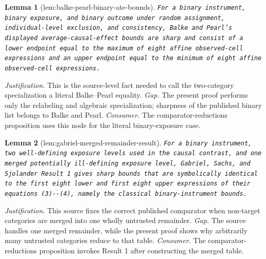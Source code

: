 \documentclass{article}
\newtheorem{lemma}{Lemma}
\begin{document}
\begin{lemma}[lem:balke-pearl-binary-ate-bounds]\label{lem:balke-pearl-binary-ate-bounds}
\texttt{For a binary instrument,\allowbreak{} binary exposure,\allowbreak{} and binary outcome under random assignment,\allowbreak{} individual-\allowbreak{}level exclusion,\allowbreak{} and consistency,\allowbreak{} Balke and Pearl's displayed average-\allowbreak{}causal-\allowbreak{}effect bounds are sharp and consist of a lower endpoint equal to the maximum of eight affine observed-\allowbreak{}cell expressions and an upper endpoint equal to the minimum of eight affine observed-\allowbreak{}cell expressions.}
\end{lemma}
\par\smallskip\noindent \textit{Justification.} This is the source-level fact needed to call the two-category specialization a literal Balke--Pearl equality. \textit{Gap.} The present proof performs only the relabeling and algebraic specialization; sharpness of the published binary list belongs to Balke and Pearl. \textit{Consumer.} The comparator-reductions proposition uses this node for the literal binary-exposure case.

\begin{lemma}[lem:gabriel-merged-remainder-result]\label{lem:gabriel-merged-remainder-result}
\texttt{For a binary instrument,\allowbreak{} two well-\allowbreak{}defining exposure levels used in the causal contrast,\allowbreak{} and one merged potentially ill-\allowbreak{}defining exposure level,\allowbreak{} Gabriel,\allowbreak{} Sachs,\allowbreak{} and Sjolander Result 1 gives sharp bounds that are symbolically identical to the first eight lower and first eight upper expressions of their equations (3)-\allowbreak{}-\allowbreak{}(4),\allowbreak{} namely the classical binary-\allowbreak{}instrument bounds.}
\end{lemma}
\par\smallskip\noindent \textit{Justification.} This source fixes the correct published comparator when non-target categories are merged into one wholly untrusted remainder. \textit{Gap.} The source handles one merged remainder, while the present proof shows why arbitrarily many untrusted categories reduce to that table. \textit{Consumer.} The comparator-reductions proposition invokes Result 1 after constructing the merged table.
\end{document}
